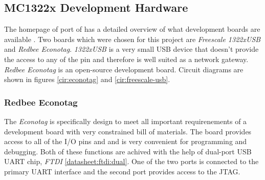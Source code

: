 
 

\subsection{MC1322x Development Hardware}

  The homepage of  port of \contiki has a detailed
 overview of what development boards are available \cite{homepage:mc1322x:hw}.
 Two boards which were chosen for this project are \emph{Freescale
 1322xUSB} and \emph{Redbee Econotag}.
 \emph{1322xUSB} is a very small USB device that doesn't provide the
 access to any of the pin and therefore is well suited as a network
 gateway. \emph{Redbee Econotag} is an open-source development board.
  Circuit diagrams are shown in figures \ref{cir:econotag} and 
 \ref{cir:freescale-usb}.

\subsubsection{Redbee Econotag}

  The \emph{Econotag} is specifically design to meet all important
 requirenements of a development board with very constrained bill of
 materials. The board provides access to all of the I/O pins and
 and is very convenient for programming and debugging. Both of these
 functions are achived with the help of dual-port USB UART chip,
 \emph{FTDI}  \ref{datasheet:ftdi:dual}. One of the two
 ports is connected to the primary UART interface and the second port
 provides access to the JTAG.

 

